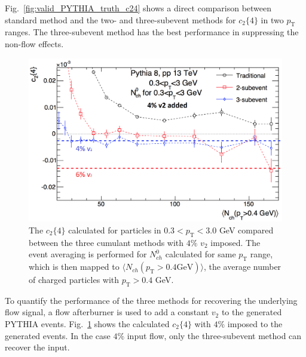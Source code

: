 Fig.~\ref{fig:valid_PYTHIA_truth_c24} shows a direct comparison between standard method and the two- and three-subevent methods for $c_{2}\{4\}$ in two $p_{\text{T}}$ ranges. The three-subevent method has the best performance in suppressing the non-flow effects.

\begin{figure}[H]
\centering
\includegraphics[width=0.45\linewidth]{figs/sec_ana/valid_PYTHIA_truth_c24_wFlow.png}
\caption{The $c_{2}\{4\}$ calculated for particles in $0.3<p_{\text{T}}<3.0$ GeV compared between the three cumulant methods with $4\%$ $v_{2}$ imposed. The event averaging is performed for $N_{ch}^{0}$ calculated for same $p_{\text{T}}$ range, which is then mapped to $\langle N_{ch}(p_{\text{T}}>0.4 \text{GeV}) \rangle$, the average number of charged particles with $p_{\text{T}}>0.4$ GeV.}
\label{fig:valid_PYTHIA_truth_c24_wFlow}
\end{figure}

To quantify the performance of the three methods for recovering the underlying flow signal, a flow afterburner is used to add a constant $v_{2}$ to the generated PYTHIA events. Fig.~\ref{fig:valid_PYTHIA_truth_c24_wFlow} shows the calculated $c_{2}\{4\}$ with $4\%$ imposed to the generated events. In the case $4\%$ input flow, only the three-subevent method can recover the input.


